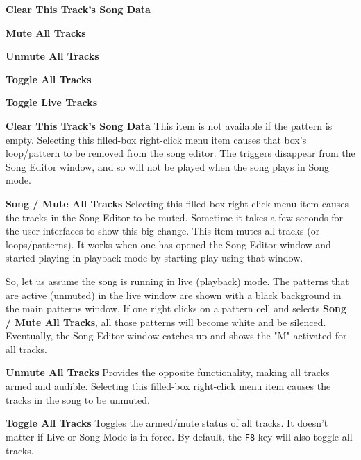    \begin{enumber}
      \item \textbf{Clear This Track's Song Data}
      \item \textbf{Mute All Tracks}
      \item \textbf{Unmute All Tracks}
      \item \textbf{Toggle All Tracks}
      \item \textbf{Toggle Live Tracks}
   \end{enumber}


   \textbf{Clear This Track's Song Data}
   This item is not available if the pattern is empty.
   Selecting this filled-box right-click menu item causes that box's
   loop/pattern to be removed from the song editor.
   The triggers disappear from the Song Editor window, and so will not
   be played when the song plays in Song mode.

   \textbf{Song / Mute All Tracks}
   Selecting this filled-box right-click menu item causes
   the tracks in the Song Editor to be muted.  Sometime it takes a few seconds
   for the user-interfaces to show this big change.
   This item mutes all tracks (or loops/patterns).
   It works when one has opened the Song Editor window
   and started playing in playback
   mode by starting play using that window.

   So, let us assume the song is running in live (playback) mode.
   The patterns that are active (unmuted) in the live window are shown with a
   black background in the main patterns window.  If one right clicks on a
   pattern cell and selects \textbf{Song / Mute All Tracks}, all those patterns
   will become white and be silenced.  Eventually, the Song Editor window
   catches up and shows the "M" activated for all tracks.

   \textbf{Unmute All Tracks}
   Provides the opposite functionality, making all tracks armed and audible.
   Selecting this filled-box right-click menu item causes
   the tracks in the song to be unmuted.

   \textbf{Toggle All Tracks}
   Toggles the armed/mute status of all tracks.
   It doesn't matter if Live or Song Mode is in force.
   By default, the \texttt{F8} key will also toggle all tracks.


